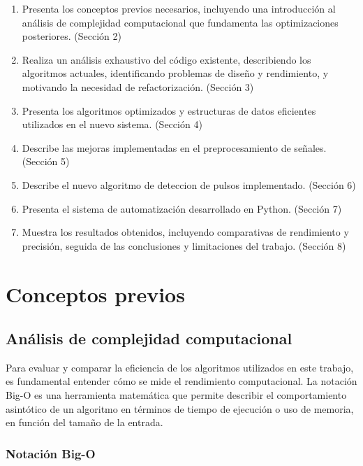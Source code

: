 \documentclass[12pt,a4paper]{article}
\begin{document}
\begin{enumerate}
    \item Presenta los conceptos previos necesarios, incluyendo una introducción al análisis de complejidad computacional que fundamenta las optimizaciones posteriores. (Sección 2)

    \item Realiza un análisis exhaustivo del código existente, describiendo los algoritmos actuales, identificando problemas de diseño y rendimiento, y motivando la necesidad de refactorización. (Sección 3)

    \item Presenta los algoritmos optimizados y estructuras de datos eficientes utilizados en el nuevo sistema. (Sección 4)

    \item Describe las mejoras implementadas en el preprocesamiento de señales. (Sección 5)

    \item Describe el nuevo algoritmo de deteccion de pulsos implementado. (Sección 6)

    \item Presenta el sistema de automatización desarrollado en Python. (Sección 7)

    \item Muestra los resultados obtenidos, incluyendo comparativas de rendimiento y precisión, seguida de las conclusiones y limitaciones del trabajo. (Sección 8)
\end{enumerate}

\section{Conceptos previos}

\subsection{Análisis de complejidad computacional}
\lhead{}

Para evaluar y comparar la eficiencia de los algoritmos utilizados en este trabajo, es fundamental entender cómo se mide el rendimiento computacional. La notación Big-O es una herramienta matemática que permite describir el comportamiento asintótico de un algoritmo en términos de tiempo de ejecución o uso de memoria, en función del tamaño de la entrada.

\subsubsection{Notación Big-O}
\end{document}

